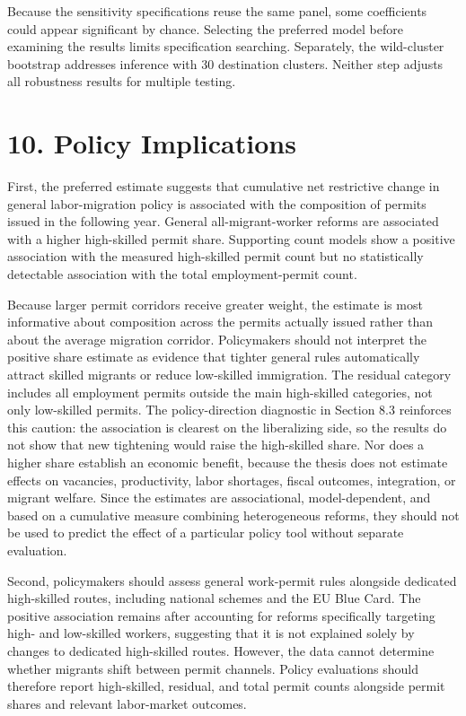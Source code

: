 \documentclass[11pt,a4paper]{article}
\begin{document}
Because the sensitivity specifications reuse the same panel, some
coefficients could appear significant by chance. Selecting the preferred
model before examining the results limits specification searching.
Separately, the wild-cluster bootstrap addresses inference with 30
destination clusters. Neither step adjusts all robustness results for
multiple testing.

\clearpage
\section{10. Policy Implications}\label{policy-implications}

First, the preferred estimate suggests that cumulative net restrictive
change in general labor-migration policy is associated with the
composition of permits issued in the following year. General
all-migrant-worker reforms are associated with a higher high-skilled
permit share. Supporting count models show a positive association with
the measured high-skilled permit count but no statistically detectable
association with the total employment-permit count.

Because larger permit corridors receive greater weight, the estimate is
most informative about composition across the permits actually issued
rather than about the average migration corridor. Policymakers should
not interpret the positive share estimate as evidence that tighter
general rules automatically attract skilled migrants or reduce
low-skilled immigration. The residual category includes all employment
permits outside the main high-skilled categories, not only low-skilled
permits. The policy-direction diagnostic in Section 8.3 reinforces this
caution: the association is clearest on the liberalizing side, so the
results do not show that new tightening would raise the high-skilled
share. Nor does a higher share establish an economic benefit, because
the thesis does not estimate effects on vacancies, productivity, labor
shortages, fiscal outcomes, integration, or migrant welfare. Since the
estimates are associational, model-dependent, and based on a cumulative
measure combining heterogeneous reforms, they should not be used to
predict the effect of a particular policy tool without separate
evaluation.

Second, policymakers should assess general work-permit rules alongside
dedicated high-skilled routes, including national schemes and the EU
Blue Card. The positive association remains after accounting for reforms
specifically targeting high- and low-skilled workers, suggesting that it
is not explained solely by changes to dedicated high-skilled routes.
However, the data cannot determine whether migrants shift between permit
channels. Policy evaluations should therefore report high-skilled,
residual, and total permit counts alongside permit shares and relevant
labor-market outcomes.
\end{document}
